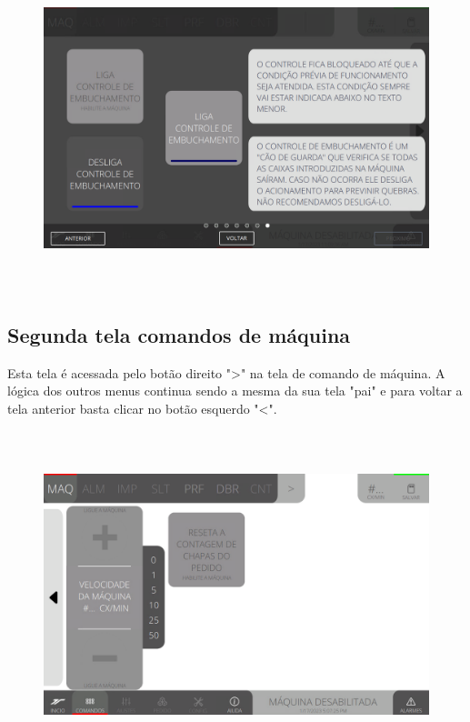 \begin{figure}[h]
  \centering
  \includegraphics[width=576px,height=360px]{src/imagesFlexo/02-machine/e-7.png}
\end{figure}

\vspace*{\fill}

\newpage
\thispagestyle{fancy}

\vspace*{40 pt}

\subsection{Segunda tela comandos de máquina}

Esta tela é acessada pelo botão direito "\textgreater" na tela de comando de máquina. A lógica dos outros menus continua sendo a mesma da sua tela "pai" e para voltar a tela anterior basta clicar no botão esquerdo "\textless{}".

\vspace*{\fill}

\begin{figure}[h]
  \centering
  \includegraphics[width=576px,height=360px]{src/imagesFlexo/02-machine/e-Tela-Principal-2.png}
\end{figure}

